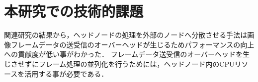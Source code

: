  \section{本研究での技術的課題}
関連研究の結果から，ヘッドノードの処理を外部のノードへ分散させる手法は画像フレームデータの送受信のオーバーヘッドが生じるためパフォーマンスの向上への貢献度が低い事がわかった．
フレームデータ送受信のオーバーヘッドを生じさせずにフレーム処理の並列化を行うためには，ヘッドノード内のCPUリソースを活用する事が必要である．

